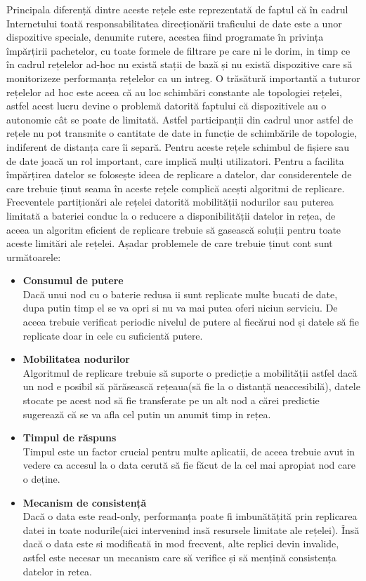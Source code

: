 \documentclass[12pt,a4paper]{report}
\begin{document}
Principala diferență dintre aceste rețele este reprezentată de faptul că în cadrul Internetului toată responsabilitatea direcționării traficului de date este a unor dispozitive speciale, denumite rutere, acestea fiind programate în privința împărțirii pachetelor, cu toate formele de filtrare pe care ni le dorim, in timp ce în cadrul rețelelor ad-hoc nu există stații de bază și nu există dispozitive care să monitorizeze performanța rețelelor ca un intreg. O trăsătură importantă a tuturor rețelelor ad hoc este aceea că au loc schimbări constante ale topologiei rețelei, astfel acest lucru devine o problemă datorită faptului că dispozitivele au o autonomie cât se poate de limitată. Astfel participanții din cadrul unor astfel de rețele nu pot transmite o cantitate de date in funcție de schimbările de topologie, indiferent de distanța care îi separă.
Pentru aceste rețele schimbul de fișiere sau de date joacă un rol important, care implică mulți utilizatori. Pentru a facilita împărțirea datelor se folosește ideea de replicare a datelor, dar considerentele de care trebuie ținut seama în aceste rețele complică acești algoritmi de replicare. Frecventele partiționări ale rețelei datorită mobilității nodurilor sau puterea limitată a bateriei conduc la o reducere a disponibilității datelor in rețea, de aceea un algoritm eficient de replicare trebuie să gasească soluții pentru toate aceste limitări ale rețelei. Așadar problemele de care trebuie ținut cont sunt următoarele:
\begin{itemize}
	\item\textbf{Consumul de putere} \hfill \\
	Dacă unui nod cu o baterie redusa ii sunt replicate multe bucati de date, dupa putin timp el se va opri si nu va mai putea oferi niciun serviciu. De aceea trebuie verificat periodic nivelul de putere al fiecărui nod și datele să fie replicate doar in cele cu suficientă putere.
	\item\textbf{Mobilitatea nodurilor} \hfill \\
	Algoritmul de replicare trebuie să suporte o predicție a mobilității astfel dacă un nod e posibil să părăsească rețeaua(să fie la o distanță neaccesibilă), datele stocate pe acest nod să fie transferate pe un alt nod a cărei predictie sugerează că se va afla cel putin un anumit timp in rețea.
	\item\textbf{Timpul de răspuns} \hfill \\
	Timpul este un factor crucial pentru multe aplicatii, de aceea trebuie avut in vedere ca accesul la o data cerută să fie făcut de la cel mai apropiat nod care o deține.
	\item\textbf{Mecanism de consistență} \hfill \\
	Dacă o data este read-only, performanța poate fi imbunătățită prin replicarea datei in toate nodurile(aici intervenind insă resursele limitate ale rețelei). Însă dacă o data este si modificată in mod frecvent, alte replici devin invalide, astfel este necesar un mecanism care să verifice și să mențină consistența datelor in retea.
\end{itemize}
\end{document}
